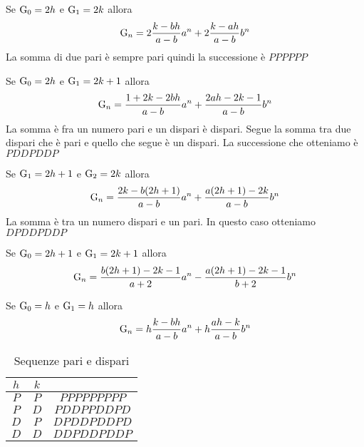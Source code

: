 \begin{commento}
	Se $\mathrm{G}_{0}={}2h$ e $\mathrm{G}_{1}={}2k$ allora \begin{equation}
		\mathrm{G}_{n}={}2\dfrac{k-bh}{a-b}a^n+2\dfrac{k-ah}{a-b}b^n
	\end{equation}
La somma di due pari è sempre pari quindi la successione è $PPPPPP$
\end{commento}
\begin{commento}
	Se $\mathrm{G}_{0}={}2h$ e $\mathrm{G}_{1}={}2k+1$ allora \begin{equation}
		\mathrm{G}_{n}={}\dfrac{1+2k-2bh}{a-b}a^n+\dfrac{2ah-2k-1}{a-b }b^n
	\end{equation}
La somma è fra un numero pari e un dispari è dispari. Segue la somma tra due dispari che è pari e quello che segue è un dispari. La successione che otteniamo  è $PDDPDDP$
\end{commento}
\begin{commento}
	Se $\mathrm{G}_{1}={}2h+1$ e $\mathrm{G}_{2}={}2k$ allora \begin{equation}
		\mathrm{G}_{n}={}\dfrac{2k-b(2h+1)}{a-b}a^n+\dfrac{a(2h+1)-2k}{a-b}b^n
	\end{equation}
La somma è tra un numero dispari e un pari. In questo caso otteniamo $DPDDPDDP$
\end{commento}
\begin{commento}
	Se $\mathrm{G}_{0}={}2h+1$ e $\mathrm{G}_{1}={}2k+1$ allora \begin{equation}
		\mathrm{G}_{n}={}\dfrac{b(2h+1)-2k-1}{a+2}a^n-\dfrac{a(2h+1)-2k-1}{b+2}b^n
	\end{equation}
\end{commento}
\begin{commento}
	Se $\mathrm{G}_{0}={}h$ e $\mathrm{G}_{1}={}h$ allora \begin{equation}
		\mathrm{G}_{n}={}h\dfrac{k-bh}{a-b}a^n+h\dfrac{ah-k}{a-b}b^n
	\end{equation}
\end{commento}
\begin{table}
	\centering
	\begin{tabular}{ccc}
\toprule
$h$&$k$&\\
\midrule
	$P$& $P$ &$PPPPPPPPP$ \\
	$P$& $D$ &$PDDPPDDPD$  \\
	$D$& $P$ &$DPDDPDDPD$  \\
	$D$& $D$ &$DDPDDPDDP$  \\
\bottomrule
\end{tabular}
	\caption{Sequenze pari e dispari}
\end{table}
